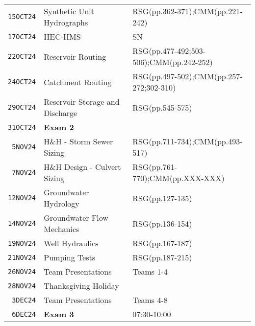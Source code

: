 \documentclass[12pt]{article}
\begin{document}
\begin{table}[ht!]
\begin{tabular}{p{0.5in}p{3.0in}p{3.0in}}
\texttt{15OCT24} & Synthetic Unit Hydrographs & RSG(pp.362-371);CMM(pp.221-242) \\ %
\texttt{17OCT24} & HEC-HMS  & SN \\ %
\texttt{22OCT24} & Reservoir Routing &RSG(pp.477-492;503-506);CMM(pp.242-252)  \\ %
\texttt{24OCT24} & Catchment Routing &RSG(pp.497-502);CMM(pp.257-272;302-310)\\ %
\texttt{29OCT24} & Reservoir Storage and Discharge & RSG(pp.545-575)\\ %
\texttt{31OCT24} & \textbf{Exam 2} & \\ %
\texttt{~5NOV24} & H\&H - Storm Sewer Sizing &RSG(pp.711-734);CMM(pp.493-517)  \\ %
\texttt{~7NOV24} & H\&H Design - Culvert Sizing & RSG(pp.761-770);CMM(pp.XXX-XXX)  \\ %
\texttt{12NOV24} & Groundwater Hydrology & RSG(pp.127-135)  \\ %
\texttt{14NOV24} & Groundwater Flow Mechanics & RSG(pp.136-154) \\ %
\texttt{19NOV24} & Well Hydraulics & RSG(pp.167-187) \\ %
\texttt{21NOV24} & Pumping Tests & RSG(pp.187-215) \\ %
\texttt{26NOV24} & Team Presentations &  Teams 1-4\\ %
\texttt{28NOV24} & Thanksgiving Holiday &    \\ %
\texttt{~3DEC24} & Team Presentations & Teams 4-8 \\ %
\texttt{~6DEC24} & \textbf{Exam 3} & 07:30-10:00 \\ %
\hline
   \end{tabular}
   \label{tab:fall2013schedule}
\end{table}


\clearpage
\end{document}
